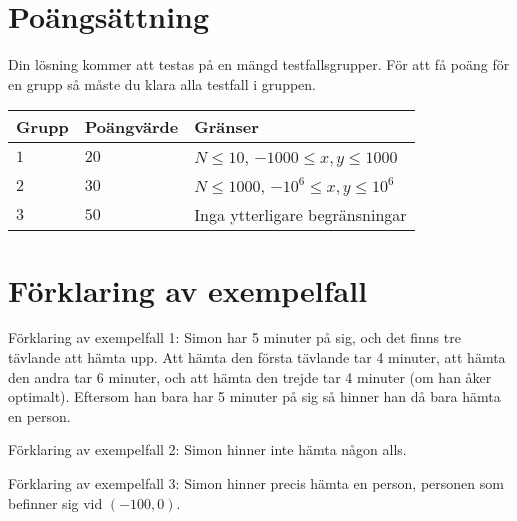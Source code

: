 \section*{Poängsättning}
Din lösning kommer att testas på en mängd testfallsgrupper.
För att få poäng för en grupp så måste du klara alla testfall i gruppen.

\noindent
\begin{tabular}{| l | l | l |}
  \hline
  Grupp & Poängvärde & Gränser \\ \hline
  $1$   & $20$       & $N \leq 10$, $-1000 \leq x,y \leq 1000$ \\ \hline
  $2$   & $30$       & $N \leq 1000$, $-10^6 \leq x,y \leq 10^6$ \\ \hline
  $3$   & $50$       & Inga ytterligare begränsningar \\ \hline
\end{tabular}

\section*{Förklaring av exempelfall}
Förklaring av exempelfall 1: Simon har 5 minuter på sig, och det finns tre tävlande att hämta upp. Att hämta den första tävlande tar 4 minuter, att hämta den andra tar 6 minuter, och att hämta den trejde tar 4 minuter (om han åker optimalt). Eftersom han bara har 5 minuter på sig så hinner han då bara hämta en person.

Förklaring av exempelfall 2: Simon hinner inte hämta någon alls.

Förklaring av exempelfall 3: Simon hinner precis hämta en person, personen som befinner sig vid $(-100, 0)$.